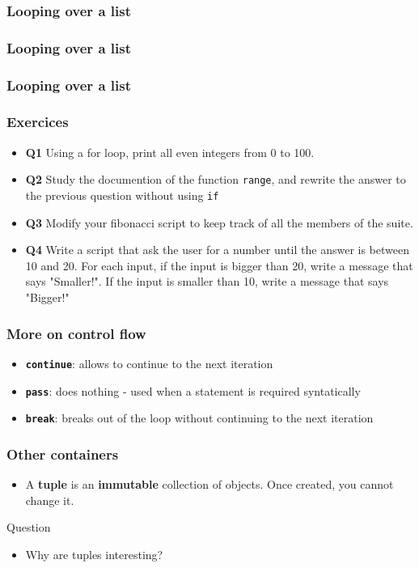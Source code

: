 \documentclass[xcolor=dvipsnames]{beamer}
\begin{document}
\begin{frame}
\frametitle{Looping over a list}

\end{frame}

\begin{frame}
\frametitle{Looping over a list}

\end{frame}

\begin{frame}
\frametitle{Looping over a list}

\end{frame}

\begin{frame}
\frametitle{Exercices}
\begin{itemize}
\item \textbf{Q1} Using a for loop, print all even integers from 0 to 100.
\item \textbf{Q2} Study the documention of the function \texttt{range}, and
rewrite the answer to the previous question without using \texttt{if}
\item \textbf{Q3} Modify your fibonacci script to keep track of all the members
of the suite.
\item \textbf{Q4} Write a script that ask the user for a number until the
answer is between 10 and 20. For each input, if the input is bigger than 20,
write a message that says "Smaller!". If the input is smaller than 10, write a
message that says "Bigger!"
\end{itemize}
\end{frame}

\begin{frame}
\frametitle{More on control flow}
\begin{itemize}
\item \texttt{\textbf{continue}}: allows to continue to the next iteration
\item \texttt{\textbf{pass}}: does nothing - used when a statement is required
syntatically
\item \texttt{\textbf{break}}: breaks out of the loop without continuing to the
next iteration
\end{itemize}



\end{frame}

\begin{frame}
\frametitle{Other containers}
\begin{itemize}
\item A \textbf{tuple} is an \textbf{immutable} collection of objects. Once
created, you cannot change it.

\end{itemize}

\begin{alertblock}{Question}
\begin{itemize}
\item Why are tuples interesting?
\end{itemize}
\end{alertblock}
\end{frame}
\end{document}
